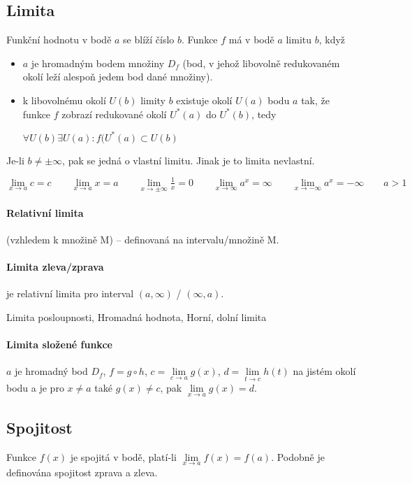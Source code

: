 \documentclass[a4paper, 11pt]{report}
\begin{document}
\subsection{Limita}
Funkční hodnotu v bodě $a$ se blíží číslo $b$. Funkce $f$ má v bodě $a$ limitu $b$, když
\begin{itemize}
	\item $a$ je hromadným bodem množiny $D_f$ (bod, v jehož libovolně redukovaném okolí leží alespoň jedem bod dané množiny).
	\item k libovolnému okolí $U(b)$ limity $b$ existuje okolí $U(a)$ bodu $a$ tak, že funkce $f$ zobrazí redukované okolí $U^*(a)$ do $U^*(b)$, tedy
	
	$\forall U(b) \exists U(a): f(U^*(a) \subset U(b)$
\end{itemize}

Je-li $b \neq \pm \infty$, pak se jedná o vlastní limitu. Jinak je to limita nevlastní.

$\lim\limits_{x \to a} c = c \qquad
\lim\limits_{x \to a} x = a \qquad
\lim\limits_{x \to \pm \infty} \frac{1}{x} = 0 \qquad
\lim\limits_{x \to \infty} a^x = \infty \qquad
\lim\limits_{x \to - \infty} a^x = - \infty \qquad a > 1$

\paragraph{Relativní limita} (vzhledem k množině M) -- definovaná na intervalu/množině M.

\paragraph{Limita zleva/zprava} je relativní limita pro interval $(a,\infty)$ / $(\infty, a)$.

Limita posloupnosti, Hromadná hodnota, Horní, dolní limita

\paragraph{Limita složené funkce} $a$ je hromadný bod $D_f$, $f = g \circ h$, $c = \lim\limits_{c \to a} g(x)$, $d = \lim\limits_{t \to c} h(t)$ na jistém okolí bodu a je pro $x \neq a$ také $g(x) \neq c$, pak $\lim\limits_{x \to a} g(x) = d$.

\subsection{Spojitost}
Funkce $f(x)$ je spojitá v bodě, platí-li $\lim\limits_{x \to a} f(x) = f(a)$. Podobně je definována spojitost zprava a zleva.
\end{document}
